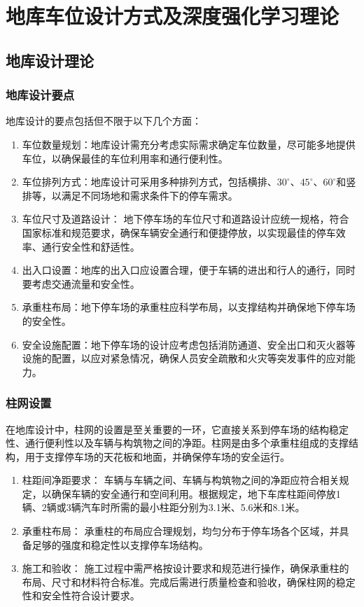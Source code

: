 \section{地库车位设计方式及深度强化学习理论}
\subsection{地库设计理论}
\subsubsection{地库设计要点}
地库设计的要点包括但不限于以下几个方面：
\begin{enumerate}
    \item 车位数量规划：地库设计需充分考虑实际需求确定车位数量，尽可能多地提供车位，以确保最佳的车位利用率和通行便利性。
    \item 车位排列方式：地库设计可采用多种排列方式，包括横排、${30}^\circ$、${45}^\circ$、${60}^\circ$和竖排等，以满足不同场地和需求条件下的停车需求。
    \item 车位尺寸及道路设计： 地下停车场的车位尺寸和道路设计应统一规格，符合国家标准和规范要求，确保车辆安全通行和便捷停放，以实现最佳的停车效率、通行安全性和舒适性。
    \item 出入口设置：地库的出入口应设置合理，便于车辆的进出和行人的通行，同时要考虑交通流量和安全性。
    \item 承重柱布局：地下停车场的承重柱应科学布局，以支撑结构并确保地下停车场的安全性。
    \item 安全设施配置：地下停车场的设计应考虑包括消防通道、安全出口和灭火器等设施的配置，以应对紧急情况，确保人员安全疏散和火灾等突发事件的应对能力。
\end{enumerate}
\subsubsection{柱网设置}
在地库设计中，柱网的设置是至关重要的一环，它直接关系到停车场的结构稳定性、通行便利性以及车辆与构筑物之间的净距。柱网是由多个承重柱组成的支撑结构，用于支撑停车场的天花板和地面，并确保停车场的安全运行。
\begin{enumerate}
    \item 柱距间净距要求： 车辆与车辆之间、车辆与构筑物之间的净距应符合相关规定，以确保车辆的安全通行和空间利用。根据规定，地下车库柱距间停放1辆、2辆或3辆汽车时所需的最小柱距分别为3.1米、5.6米和8.1米。
    \item 承重柱布局： 承重柱的布局应合理规划，均匀分布于停车场各个区域，并具备足够的强度和稳定性以支撑停车场结构。
    \item 施工和验收： 施工过程中需严格按设计要求和规范进行操作，确保承重柱的布局、尺寸和材料符合标准。完成后需进行质量检查和验收，确保柱网的稳定性和安全性符合设计要求。
\end{enumerate}

